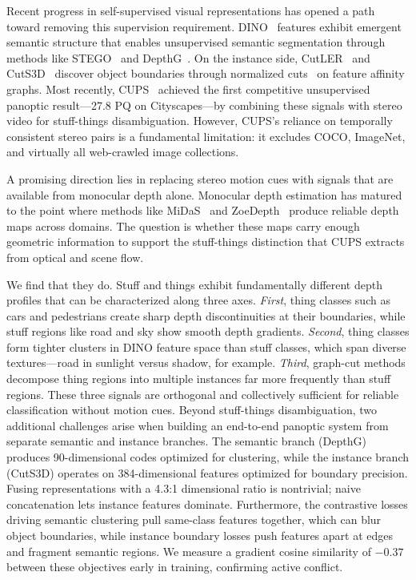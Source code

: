 \documentclass[10pt,twocolumn,letterpaper]{article}
\begin{document}
Recent progress in self-supervised visual representations has opened a path toward removing this supervision requirement. DINO~\cite{caron2021dino} features exhibit emergent semantic structure that enables unsupervised semantic segmentation through methods like STEGO~\cite{hamilton2022stego} and DepthG~\cite{sick2024depthg}. On the instance side, CutLER~\cite{wang2023cutler} and CutS3D~\cite{sick2025cuts3d} discover object boundaries through normalized cuts~\cite{shi2000ncut} on feature affinity graphs. Most recently, CUPS~\cite{hahn2025cups} achieved the first competitive unsupervised panoptic result---27.8 PQ on Cityscapes---by combining these signals with stereo video for stuff-things disambiguation. However, CUPS's reliance on temporally consistent stereo pairs is a fundamental limitation: it excludes COCO, ImageNet, and virtually all web-crawled image collections.

A promising direction lies in replacing stereo motion cues with signals that are available from monocular depth alone. Monocular depth estimation has matured to the point where methods like MiDaS~\cite{ranftl2020midas} and ZoeDepth~\cite{bhat2023zoedepth} produce reliable depth maps across domains. The question is whether these maps carry enough geometric information to support the stuff-things distinction that CUPS extracts from optical and scene flow.

We find that they do. Stuff and things exhibit fundamentally different depth profiles that can be characterized along three axes. \emph{First}, thing classes such as cars and pedestrians create sharp depth discontinuities at their boundaries, while stuff regions like road and sky show smooth depth gradients. \emph{Second}, thing classes form tighter clusters in DINO feature space than stuff classes, which span diverse textures---road in sunlight versus shadow, for example. \emph{Third}, graph-cut methods decompose thing regions into multiple instances far more frequently than stuff regions. These three signals are orthogonal and collectively sufficient for reliable classification without motion cues. Beyond stuff-things disambiguation, two additional challenges arise when building an end-to-end panoptic system from separate semantic and instance branches. The semantic branch (DepthG) produces 90-dimensional codes optimized for clustering, while the instance branch (CutS3D) operates on 384-dimensional features optimized for boundary precision. Fusing representations with a 4.3:1 dimensional ratio is nontrivial; naive concatenation lets instance features dominate. Furthermore, the contrastive losses driving semantic clustering pull same-class features together, which can blur object boundaries, while instance boundary losses push features apart at edges and fragment semantic regions. We measure a gradient cosine similarity of $-0.37$ between these objectives early in training, confirming active conflict.
\end{document}
